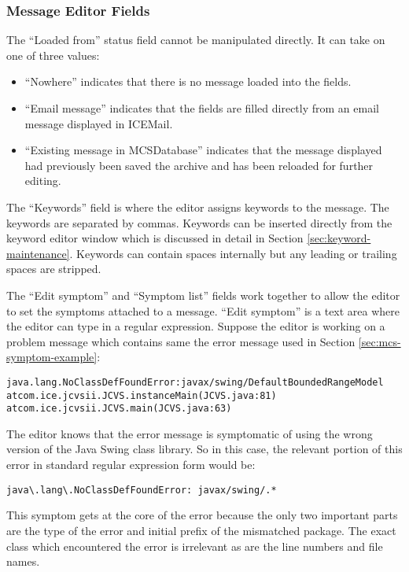 \subsubsection{Message Editor Fields}
The ``Loaded from'' status field cannot be manipulated directly. It can take on
one of three values:
\begin{itemize}
\item ``Nowhere'' indicates that there is no message loaded into the fields.
\item ``Email message'' indicates that the fields are filled directly from an
  email message displayed in ICEMail.
\item ``Existing message in MCSDatabase'' indicates that the message displayed
  had previously been saved the archive and has been reloaded for further
  editing.
\end{itemize}

The ``Keywords'' field is where the editor assigns keywords to the message.
The keywords are separated by commas. Keywords can be inserted directly from
the keyword editor window which is discussed in detail in Section
\ref{sec:keyword-maintenance}. Keywords can contain spaces internally but any
leading or trailing spaces are stripped.

The ``Edit symptom'' and ``Symptom list'' fields work together to allow the
editor to set the symptoms attached to a message. ``Edit symptom'' is a text
area where the editor can type in a regular expression. Suppose the editor is
working on a problem message which contains same the error message used in
Section \ref{sec:mcs-symptom-example}:

\begin{alltt}
{\small{}java.lang.NoClassDefFoundError: javax/swing/DefaultBoundedRangeModel
        at com.ice.jcvsii.JCVS.instanceMain(JCVS.java:81)
        at com.ice.jcvsii.JCVS.main(JCVS.java:63)}
\end{alltt}

The editor knows that the error message is symptomatic of using the wrong
version of the Java Swing class library. So in this case, the relevant portion
of this error in standard regular expression form would be:

\begin{verbatim}
java\.lang\.NoClassDefFoundError: javax/swing/.*
\end{verbatim}

This symptom gets at the core of the error because the only two important parts
are the type of the error and initial prefix of the mismatched package. The
exact class which encountered the error is irrelevant as are the line numbers
and file names.

